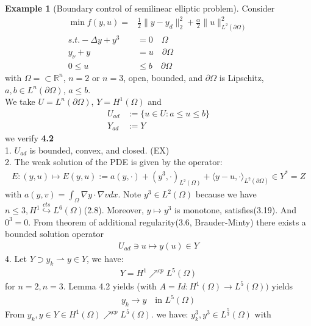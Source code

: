 \documentclass[a4paper,11pt,fleqn]{book}
\theoremstyle{definition}
\newtheorem*{example}{Example}
\theoremstyle{remark}
\begin{document}
\begin{example}[Boundary control of semilinear elliptic problem]
		Consider 
		\begin{align*}
			\min f(y, u) =& \frac{1}{2} \|y - y_d\|^2_2 + \frac{\alpha}{2}\|u\|^2_{L^2(\partial \Omega)}\\
			s.t. -\Delta y + y^3 &= 0 \quad \Omega\\
			y_\nu + y &= u \quad \partial \Omega\\
			0 \le u &\le b \quad \partial \Omega
		\end{align*}
		with $\Omega = \subset \mathbb{R}^n$, $n = 2$ or $n = 3$, open, bounded, and $\partial\Omega$ is Lipschitz, $a, b \in L^n(\partial\Omega)$, $a \le b$. \\
		We take $U = L^n(\partial \Omega)$, $Y = H^1(\Omega)$ and 
	\begin{align*}
		U_{ad} &:= \{u \in U: a \le u \le b \}\\
		Y_{ad} &:= Y
	\end{align*}
		we verify \textbf{4.2}\\
		1. $U_{ad}$ is bounded, convex, and closed. (EX)\\
		2. The weak solution of the PDE is given by the operator:
		\begin{align*}
			E:(y, u) \mapsto E(y, u):= a(y, \cdot) + (y^3, \cdot)_{L^2(\Omega)} + \langle y - u, \cdot \rangle _{L^2(\partial\Omega)} \in Y^* = Z
		\end{align*}
		with $a(y, v) = \int_\Omega \nabla y \cdot \nabla v dx$. Note $y^3 \in L^2(\Omega)$ because we have $n \le 3, H^1 \overset{cts}{\hookrightarrow}  L^6(\Omega)$(2.8).
		Moreover, $y \mapsto y^3$ is monotone, satisfies(3.19). And $0^3 = 0$. From theorem of additional regularity(3.6, Brauder-Minty) there exists a bounded solution operator 
		\begin{align*}
			U_{ad} \ni u \mapsto y(u) \in Y
		\end{align*} 
		4. Let $Y \supset y_k \rightharpoonup y \in Y$, we have:
		\begin{align*}
			Y = H^1 \nearrow^{cp} L^5(\Omega)
		\end{align*}
		for $n = 2, n = 3$. Lemma 4.2 yields (with $A = Id: H^1(\Omega) \rightarrow L^5(\Omega))$ yields
		\begin{align*}
			y_k \rightarrow y \quad \text{in } L^5(\Omega)
		\end{align*}
		From $y_k, y \in Y \in H^1(\Omega) \nearrow^{cp} L^5(\Omega)$. we have: $y_k^3, y^3 \in L^{\frac{5}{3}} (\Omega)$ with
		\begin{align*}

\end{align*}
\end{example}
\end{document}
